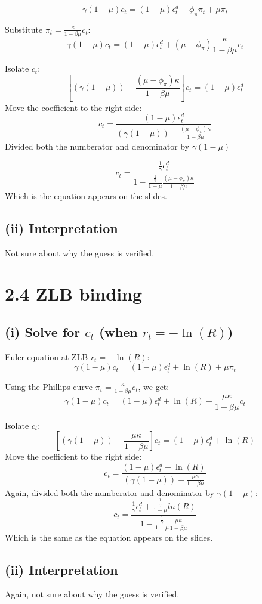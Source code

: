 \documentclass[12pt]{article}
\begin{document}
\[
\gamma(1 - \mu)c_t = (1 - \mu)\epsilon_t^d - \phi_{\pi}\pi_t + \mu \pi_t
\]

Substitute \(\pi_t = \frac{\kappa}{1-\beta\mu} c_t\):
\[
\gamma(1 - \mu)c_t = (1 - \mu)\epsilon_t^d + (\mu - \phi_{\pi})\frac{\kappa}{1 - \beta\mu} c_t
\]

Isolate \(c_t\):
\[
\left[(\gamma(1-\mu))-\frac{(\mu-\phi_\pi)\kappa}{1-\beta \mu}\right]c_t=  (1 - \mu)\epsilon_t^d
\]
Move the coefficient to the right side:
\[
c_t = \frac{(1 - \mu)\epsilon_t^d}{(\gamma(1-\mu))-\frac{(\mu-\phi_\pi)\kappa}{1-\beta \mu}}
\]
Divided both the numberator and denominator by $\gamma(1-\mu)$

\[
c_t=\frac{\frac{1}{\gamma}\epsilon_t^d}{1 - \frac{\frac{1}{\gamma}}{1-\mu}\frac{(\mu-\phi_\pi)\kappa}{1 - \beta\mu}}
\]
Which is the equation appears on the slides.
\subsection*{(ii) Interpretation}
Not sure about why the guess is verified.

\section*{2.4 ZLB binding}

\subsection*{(i) Solve for \(c_t\) (when \(r_t = -\ln(R)\))}

Euler equation at ZLB \(r_t = -\ln(R)\):
\[
\gamma(1 - \mu)c_t = (1 - \mu)\epsilon_t^d + \ln(R) + \mu \pi_t
\]

Using the Phillips curve \(\pi_t = \frac{\kappa}{1-\beta\mu} c_t\), we get:
\[
\gamma(1 - \mu)c_t = (1 - \mu)\epsilon_t^d + \ln(R) + \frac{\mu\kappa}{1-\beta\mu} c_t
\]

Isolate \(c_t\):
\[
\left[(\gamma(1-\mu))-\frac{\mu\kappa}{1-\beta\mu}\right]c_t=  (1 - \mu)\epsilon_t^d + \ln(R)
\]
Move the coefficient to the right side:
\[
c_t = \frac{(1 - \mu)\epsilon_t^d + \ln(R)}{(\gamma(1-\mu))-\frac{\mu\kappa}{1-\beta\mu}}
\]
Again, divided both the numberator and denominator by $\gamma(1-\mu)$:
\[
c_t=\frac{\frac{1}{\gamma}\epsilon_t^d + \frac{\frac{1}{\gamma}}{1-\mu}ln(R)}{1 - \frac{\frac{1}{\gamma}}{1-\mu}\frac{\mu\kappa}{1 - \beta\mu}}
\]
Which is the same as the equation appears on the slides.
\subsection*{(ii) Interpretation}
Again, not sure about why the guess is verified.
\end{document}
